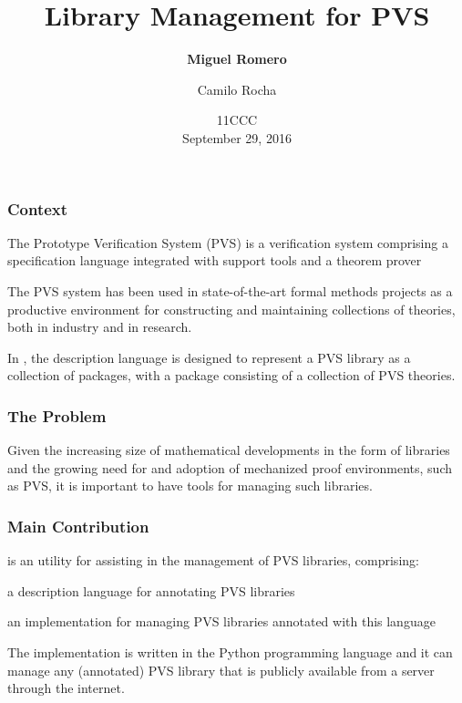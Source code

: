 \documentclass[mathserif,fleqn]{beamer}
\title{ 
  Library Management for PVS
}
\author[M. Romero]{
  {\bf Miguel Romero\Mark{1}} \and Camilo Rocha\Mark{2}
}
\institute[ECI]{
  \large \Mark{1}Escuela Colombiana de Ingenier\'ia Julio Garavito\\ \Mark{2}Pontificia Universidad Javeriana, Cali 
}
\date[MPL 09.27.2016]{
  11CCC\\
  September 29, 2016
}
\begin{document}
\begin{frame}
  \titlepage
\end{frame}

\begin{frame}
  \frametitle{Context}
 
   \begin{outeritemize}
   \item  The Prototype Verification System (PVS) is a verification system comprising a specification language integrated with support tools and a theorem prover
   \item The PVS system has been used in state-of-the-art formal methods projects as a productive environment for constructing and maintaining collections of theories, both in industry and in research.
   \item In , the description language is designed to represent a PVS library as a collection of packages, with a package consisting of a collection of PVS theories. 
   \end{outeritemize}
\end{frame}

\begin{frame}
  \frametitle{The Problem}
  Given the increasing size of mathematical developments in the form of libraries and the growing need for and adoption of mechanized proof environments, such as PVS, it is important to have tools for managing such libraries.
\end{frame}

\begin{frame}
  \frametitle{Main Contribution}
   \begin{outeritemize}
   \item {} is an utility for assisting in the management of PVS libraries, comprising:
   \begin{inneritemize}
      \item[] a description language for annotating PVS libraries
      \item[] an implementation for managing PVS libraries annotated with this language
    \end{inneritemize}
    \item The  implementation is written in the Python programming language and it can manage any (annotated) PVS library that is publicly available from a  server through the internet.
   \end{outeritemize}
\end{frame}
\end{document}

